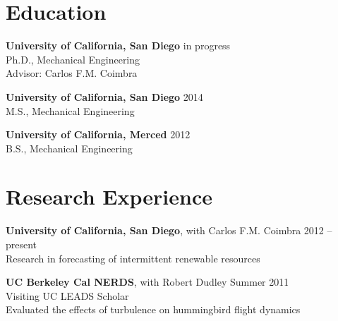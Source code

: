 \documentclass[]{res}
\begin{document}
\address{9500 Gilman Drive \#0411 \\ La Jolla, CA 92093--0411}
\address{dplarson@ucsd.edu}

\begin{resume}


\section{Education}
\vspace{0.1in}

\textbf{University of California, San Diego} \hfill in progress \\
Ph.D., Mechanical Engineering \\
Advisor: Carlos F.M. Coimbra \\

\vspace{-0.2in}

\textbf{University of California, San Diego} \hfill 2014 \\
M.S., Mechanical Engineering \\

\vspace{-0.2in}

\textbf{University of California, Merced} \hfill 2012 \\
B.S., Mechanical Engineering \\


\section{Research Experience}
\vspace{0.1in}

\textbf{University of California, San Diego}, with Carlos F.M. Coimbra \hfill 2012 -- present\\
Research in forecasting of intermittent renewable resources \\

\vspace{-0.2in}

\textbf{UC Berkeley Cal NERDS}, with Robert Dudley \hfill Summer 2011 \\
Visiting UC LEADS Scholar \\
Evaluated the effects of turbulence on hummingbird flight dynamics \\




\end{resume}
\end{document}
